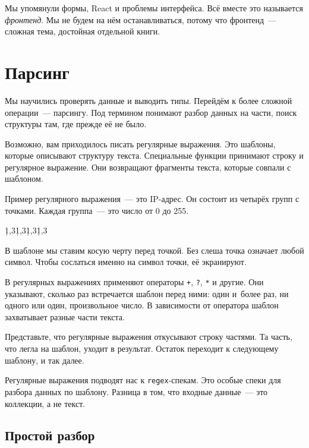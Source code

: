 
Мы упомянули формы, React и проблемы интерфейса. Всё вместе это называется
\emph{фронтенд}. Мы не будем на нём останавливаться, потому что фронтенд~---
сложная тема, достойная отдельной книги.

\section{Парсинг}

Мы научились проверять данные и выводить типы. Перейдём к более сложной
операции~--- парсингу. Под термином понимают разбор данных на части, поиск
структуры там, где прежде её не было.

Возможно, вам приходилось писать регулярные выражения. Это шаблоны, которые
описывают структуру текста. Специальные функции принимают строку и регулярное
выражение. Они возвращают фрагменты текста, которые совпали с шаблоном.

Пример регулярного выражения~--- это IP-адрес. Он состоит из четырёх групп с
точками. Каждая группа~--- это число от 0 до 255.


\begin{english}
  \begin{text}
\d{1,3}\.\d{1,3}\.\d{1,3}\.\d{1,3}
  \end{text}
\end{english}

В шаблоне мы ставим косую черту перед точкой. Без слеша точка означает любой
символ. Чтобы сослаться именно на символ точки, её экранируют.

В регулярных выражениях применяют операторы \verb|+|, \verb|?|, \verb|*| и
другие. Они указывают, сколько раз встречается шаблон перед ними: один и~более
раз, ни одного или один, произвольное число. В зависимости от оператора шаблон
захватывает разные части текста.

Представьте, что регулярные выражения откусывают строку частями. Та часть, что
легла на шаблон, уходит в результат. Остаток переходит к следующему шаблону, и
так далее.

Регулярные выражения подводят нас к \verb|regex|-спекам. Это особые спеки для
разбора данных по шаблону. Разница в том, что входные данные~--- это коллекции, а не
текст.


\subsection{Простой разбор}

